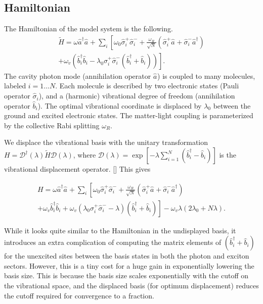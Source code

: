 \documentclass[final,twocolumn]{elsarticle}
\newcommand{\ad}{\hat{a}^\dagger}
\newcommand{\an}{\hat{a}^{}}
\newcommand{\bd}{\hat{b}^\dagger}
\newcommand{\bn}{\hat{b}^{}}
\newcommand{\az}[1]{{\color{magenta}{#1}}}
\begin{document}
\begin{small}
 
\section{Hamiltonian}
\label{sec:ham}

The Hamiltonian of the model system is the following.
\begin{multline}
 \tilde H
  =
  \omega \ad \an
  +
  \sum_i \left[
    \omega_0 \hat \sigma^+_i \hat \sigma^-_i
    +
    \frac{\omega_R}{\sqrt{N}} 
    \left( \hat \sigma^+_i \hat a^{} + \hat \sigma^-_i \hat a^\dagger \right)\right.
    \\+\left.
    \omega_v \left(
      \hat b^\dagger_i \hat b^{}_i
      - 
      \lambda_0 \sigma^+_i \hat \sigma^-_i 
      ( \hat b^\dagger_i + \hat b^{}_i ) \right)
  \right].
\end{multline}
The cavity photon mode (annihilation  operator $\an$) is coupled 
to many molecules, labeled $i=1\ldots N$.  
Each molecule is described by two electronic states 
(Pauli operator $\hat \sigma_i$), and a (harmonic) vibrational
degree of freedom (annihilation operator $\bn_i$).  
The optimal vibrational coordinate is displaced by
 $\lambda_0$ between the ground and excited electronic states.  
The matter-light coupling is parameterized by the collective
Rabi splitting $\omega_R$.

We displace the vibrational basis with the unitary transformation
$H = \mathcal{D}^\dagger(\lambda)\tilde H\mathcal{D}(\lambda)$,
where 
$\mathcal{D}(\lambda)=\exp[-\lambda\sum_{i=1}^N{(\bd_i-\bn_i)}]$ is the vibrational
displacement operator. [\az {check the sign of lambda/daggar on left or right}]
This gives %

\begin{multline}
  \label{eq:dh}
 H
  =
  \omega \ad \an
  +
  \sum_i \left[
    \omega_0 \hat \sigma^+_i \hat \sigma^-_i
    +
    \frac{\omega_R}{\sqrt{N}} 
    \left( \hat \sigma^+_i \hat a^{} + \hat \sigma^-_i \hat a^\dagger \right)
   \right.
        \\+\left.
        \omega_v
      \hat b^\dagger_i \hat b^{}_i +
     \omega_v( \lambda_0 \sigma^+_i \hat \sigma^-_i 
       - \lambda )( \hat b^\dagger_i + \hat b^{}_i )
   \right]
   - \omega_v\lambda(2\lambda_0+ N\lambda).
\end{multline}

While it looks quite similar to the Hamiltonian in the undisplayed basis, 
it introduces an extra complication of computing the matrix elements of 
$(\hat b^\dagger_i + \hat b^{}_i)$ 
for the unexcited sites
between the basis states in both the photon and exciton sectors.
However, this is a tiny cost for a huge gain in
 exponentially lowering the basis size.
 This is because the basis size scales exponentially with
  the cutoff on the vibrational space, 
  and the displaced basis (for optimum displacement) reduces the cutoff required for convergence to a fraction.
  \az{fraction, close to half? , displaceemnt? for optimum displacement. be specific here after having the plots of cutoff reduction, etc.}


\end{small}
\end{document}
